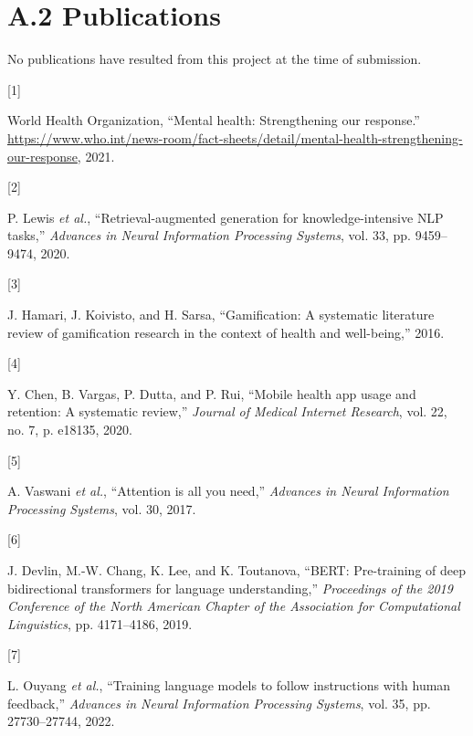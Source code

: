 \documentclass[
  letterpaper,
  12pt,
  a4paper,
  openany]{report}
\newlength{\cslhangindent}
\newlength{\csllabelwidth}
\newenvironment{CSLReferences}[2] %
 {\begin{list}{}{%
  \setlength{\itemindent}{0pt}
  \setlength{\leftmargin}{0pt}
  \setlength{\parsep}{0pt}
  \ifodd #1
   \setlength{\leftmargin}{\cslhangindent}
   \setlength{\itemindent}{-1\cslhangindent}
  \fi
  \setlength{\itemsep}{#2\baselineskip}}}
 {\end{list}}
\newcommand{\CSLLeftMargin}[1]{\parbox[t]{\csllabelwidth}{\strut#1\strut}}
\newcommand{\CSLRightInline}[1]{\parbox[t]{\linewidth - \csllabelwidth}{\strut#1\strut}}
\begin{document}
\section{A.2 Publications}\label{a.2-publications}

No publications have resulted from this project at the time of
submission.

\protect{}\label{refs}
\begin{CSLReferences}{0}{0}
\CSLLeftMargin{{[}1{]} }%
\CSLRightInline{World Health Organization, {``Mental health:
Strengthening our response.''}
\url{https://www.who.int/news-room/fact-sheets/detail/mental-health-strengthening-our-response},
2021.}

\CSLLeftMargin{{[}2{]} }%
\CSLRightInline{{P. Lewis \emph{et al.}}, {``Retrieval-augmented
generation for knowledge-intensive {NLP} tasks,''} \emph{Advances in
Neural Information Processing Systems}, vol. 33, pp. 9459--9474, 2020.}

\CSLLeftMargin{{[}3{]} }%
\CSLRightInline{J. Hamari, J. Koivisto, and H. Sarsa, {``Gamification: A
systematic literature review of gamification research in the context of
health and well-being,''} 2016.}

\CSLLeftMargin{{[}4{]} }%
\CSLRightInline{Y. Chen, B. Vargas, P. Dutta, and P. Rui, {``Mobile
health app usage and retention: A systematic review,''} \emph{Journal of
Medical Internet Research}, vol. 22, no. 7, p. e18135, 2020.}

\CSLLeftMargin{{[}5{]} }%
\CSLRightInline{A. Vaswani \emph{et al.}, {``Attention is all you
need,''} \emph{Advances in Neural Information Processing Systems}, vol.
30, 2017.}

\CSLLeftMargin{{[}6{]} }%
\CSLRightInline{J. Devlin, M.-W. Chang, K. Lee, and K. Toutanova,
{``{BERT}: Pre-training of deep bidirectional transformers for language
understanding,''} \emph{Proceedings of the 2019 Conference of the North
American Chapter of the Association for Computational Linguistics}, pp.
4171--4186, 2019.}

\CSLLeftMargin{{[}7{]} }%
\CSLRightInline{{L. Ouyang \emph{et al.}}, {``Training language models
to follow instructions with human feedback,''} \emph{Advances in Neural
Information Processing Systems}, vol. 35, pp. 27730--27744, 2022.}


\end{CSLReferences}
\end{document}
